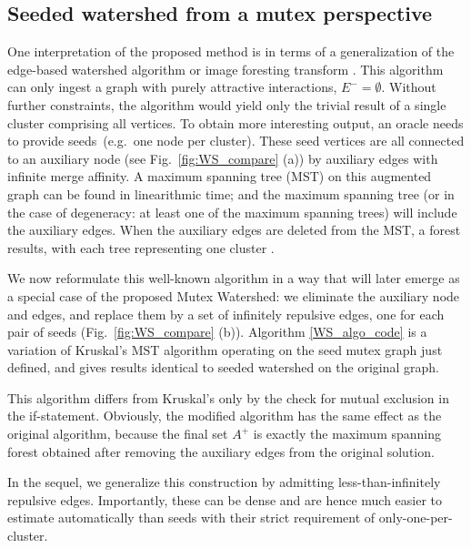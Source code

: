 \subsection{Seeded watershed from a mutex perspective}
\noindent One interpretation of the proposed method is in terms of a generalization of the edge-based watershed algorithm \cite{Meyer1994,Meyer1994minimum,meyer1999morphological}
 or image foresting transform \cite{falcao2004image}.
This algorithm can only ingest a graph with purely attractive interactions, $E^{-} = \emptyset$. Without  further constraints, the algorithm would yield only the trivial result of a single cluster comprising all vertices. To obtain more interesting output, an oracle needs to provide seeds~(e.g.\ one node per cluster). These seed vertices are all connected to an auxiliary node (see Fig.~\ref{fig:WS_compare} (a)) by auxiliary edges with infinite merge affinity. A maximum spanning tree (MST) on this augmented graph can be found in linearithmic time; and the maximum spanning tree (or in the case of degeneracy: at least one of the maximum spanning trees) will include the auxiliary edges. When the auxiliary edges are deleted from the MST, a forest results, with each tree representing one cluster \cite{meyer1999morphological,Meyer1994,falcao2004image}.

We now reformulate this well-known algorithm in a way that will later emerge as a special case of the proposed Mutex Watershed: 
we eliminate the auxiliary node and edges, and replace them by a set of infinitely repulsive edges, one for each pair of seeds (Fig.~\ref{fig:WS_compare} (b)).
Algorithm \ref{WS_algo_code} is a variation of Kruskal's MST algorithm operating on the seed mutex graph just defined, and gives results identical to seeded watershed on the original graph. 


This algorithm differs from Kruskal's only by the check for mutual exclusion in the if-statement. Obviously, the modified algorithm has the same effect as the original algorithm, because the final set $A^+$ is exactly the maximum spanning forest obtained after removing the auxiliary edges from the original solution. 

In the sequel, we generalize this construction by admitting less-than-infinitely repulsive edges. Importantly, these can be dense and are hence much easier to estimate automatically than seeds with their strict requirement of only-one-per-cluster.










